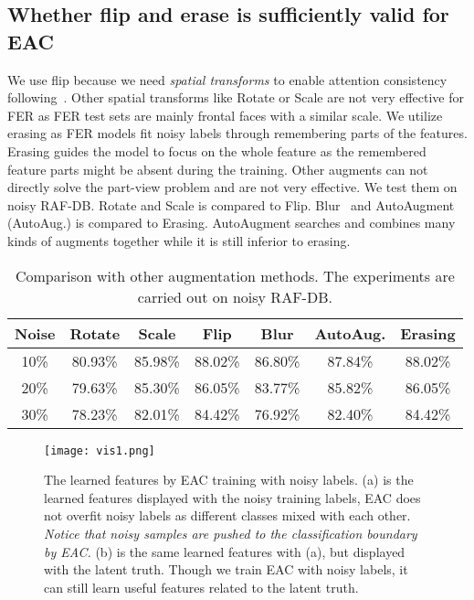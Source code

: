 \documentclass[runningheads]{llncs}
\begin{document}
\subsection{Whether flip and erase is sufficiently valid for EAC} 
We use flip because we need \emph{spatial transforms} to enable attention consistency following~\cite{guo2019visual}. Other spatial transforms like Rotate or Scale are not very effective for FER as FER test sets are mainly frontal faces with a similar scale. We utilize erasing as FER models fit noisy labels through remembering parts of the features. Erasing guides the model to focus on the whole feature as the remembered feature parts might be absent during the training. Other augments can not directly solve the part-view problem and are not very effective. We test them on noisy RAF-DB. Rotate and Scale is compared to Flip. Blur~\cite{shi2020towards} and AutoAugment~\cite{cubuk2018autoaugment} (AutoAug.) is compared to Erasing. AutoAugment searches and combines many kinds of augments together while it is still inferior to erasing. 


\begin{table}[!t]
\setlength{\tabcolsep}{5pt}
\begin{center}
\caption{Comparison with other augmentation methods. The experiments are carried out on noisy RAF-DB.}
\label{table:augments}
\begin{tabular}{cccc|ccc}
\hline
Noise & Rotate & Scale & Flip  & Blur & AutoAug. & Erasing \\ \hline
10\% & 80.93\%  & 85.98\% &\textcolor[rgb]{1,0,0}{88.02\%} &   86.80\%   &  87.84\%   & \textcolor[rgb]{1,0,0}{88.02\%}   \\
20\% & 79.63\%  & 85.30\% & \textcolor[rgb]{1,0,0}{86.05\%} &  83.77\%    & 85.82\%    & \textcolor[rgb]{1,0,0}{86.05\%}   \\
30\% & 78.23\%  & 82.01\% & \textcolor[rgb]{1,0,0}{84.42\%} &   76.92\%   & 82.40\%   & \textcolor[rgb]{1,0,0}{84.42\%}   \\
\hline
\end{tabular}
\end{center}
\end{table}

\begin{figure}[!b]
\centering
\texttt{[image: vis1.png]}
\caption{The learned features by EAC training with noisy labels. (a) is the learned features displayed with the noisy training labels, EAC does not overfit noisy labels as different classes mixed with each other. \emph{Notice that noisy samples are pushed to the classification boundary by EAC.} (b) is the same learned features with (a), but displayed with the latent truth. Though we train EAC with noisy labels, it can still learn useful features related to the latent truth.}
\label{fig:Fvisualization}
\end{figure}
\end{document}
